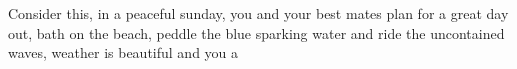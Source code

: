 Consider this, in a peaceful sunday, you and your best mates plan for a great day out, bath on the beach, peddle the blue sparking water and ride the uncontained waves, weather is beautiful and you a